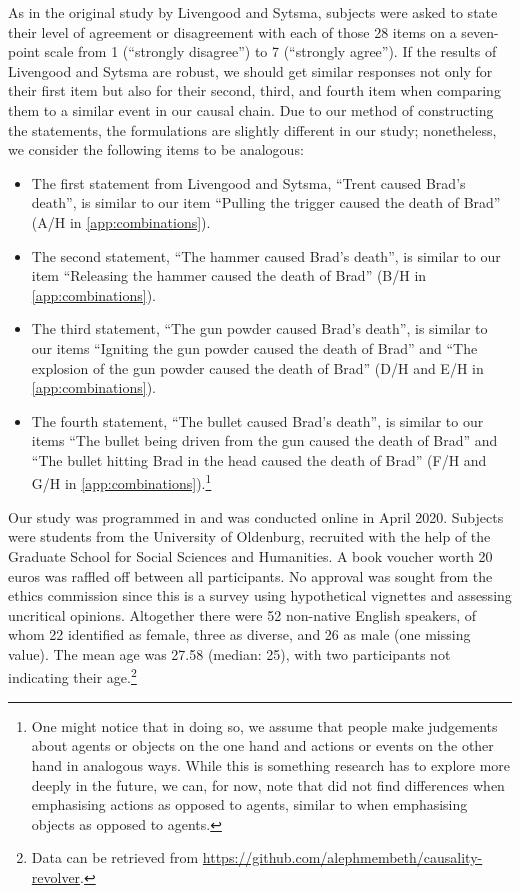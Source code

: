 \documentclass[12pt]{scrartcl}
\begin{document}
As in the original study by Livengood and Sytsma, subjects were asked to state their level of agreement or disagreement with each of those 28 items on a seven-point scale from 1 (\enquote{strongly disagree}) to 7 (\enquote{strongly agree}). If the results of Livengood and Sytsma are robust, we should get similar responses not only for their first item but also for their second, third, and fourth item when comparing them to a similar event in our causal chain. Due to our method of constructing the statements, the formulations are slightly different in our study; nonetheless, we consider the following items to be analogous:
%
\begin{itemize}
   \item The first statement from Livengood and Sytsma, \enquote{Trent caused Brad's death}, is similar to our item \enquote{Pulling the trigger caused the death of Brad} (A/H in \autoref{app:combinations}).
   \item The second statement, \enquote{The hammer caused Brad's death}, is similar to our item \enquote{Releasing the hammer caused the death of Brad} (B/H in \autoref{app:combinations}).
   \item The third statement, \enquote{The gun powder caused Brad's death}, is similar to our items \enquote{Igniting the gun powder caused the death of Brad} and \enquote{The explosion of the gun powder caused the death of Brad} (D/H and E/H in \autoref{app:combinations}).
   \item The fourth statement, \enquote{The bullet caused Brad's death}, is similar to our items \enquote{The bullet being driven from the gun caused the death of Brad} and \enquote{The bullet hitting Brad in the head caused the death of Brad} (F/H and G/H in \autoref{app:combinations}).\footnote{One might notice that in doing so, we assume that people make judgements about agents or objects on the one hand and actions or events on the other hand in analogous ways. While this is something research has to explore more deeply in the future, we can, for now, note that \citet*{livengood_following_2017} did not find differences when emphasising actions as opposed to agents, similar to \cite{livengood_actual_2020} when emphasising objects as opposed to agents.}
\end{itemize}
%
Our study was programmed in \cite{limesurvey_project_team_limesurvey_2020} and was conducted online in April 2020. Subjects were students from the University of Oldenburg, recruited with the help of the Graduate School for Social Sciences and Humanities. A book voucher worth 20 euros was raffled off between all participants. No approval was sought from the ethics commission since this is a survey using hypothetical vignettes and assessing uncritical opinions. Altogether there were 52 non-native English speakers, of whom 22 identified as female, three as diverse, and 26 as male (one missing value). The mean age was 27.58 (median: 25), with two participants not indicating their age.\footnote{Data can be retrieved from \url{https://github.com/alephmembeth/causality-revolver}.}
\end{document}
